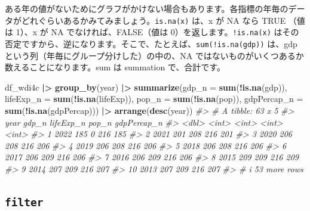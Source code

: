 \documentclass[
  xelatex, ja=standard]{bxjsbook}
\newenvironment{Shaded}{\begin{snugshade}}{\end{snugshade}}
\newcommand{\AttributeTok}[1]{\textcolor[rgb]{0.13,0.29,0.53}{#1}}
\newcommand{\CommentTok}[1]{\textcolor[rgb]{0.56,0.35,0.01}{\textit{#1}}}
\newcommand{\FunctionTok}[1]{\textcolor[rgb]{0.13,0.29,0.53}{\textbf{#1}}}
\newcommand{\NormalTok}[1]{#1}
\newcommand{\SpecialCharTok}[1]{\textcolor[rgb]{0.81,0.36,0.00}{\textbf{#1}}}
\theoremstyle{definition}
\theoremstyle{definition}
\theoremstyle{definition}
\theoremstyle{definition}
\theoremstyle{remark}
\begin{document}
ある年の値がないためにグラフがかけない場合もあります。各指標の年毎のデータがどれぐらいあるかみてみましょう。\texttt{is.na(x)} は、x が NA なら TRUE （値は 1）、x が NA でなければ、FALSE（値は 0）を返します。\texttt{!is.na(x)} はその否定ですから、逆になります。そこで、たとえば、\texttt{sum(!is.na(gdp))} は、gdp という列（年毎にグループ分けした）の中の、NA ではないものがいくつあるか数えることになります。sum は summation で、合計です。

\begin{Shaded}
\begin{Highlighting}[]
\NormalTok{df\_wdi4c }\SpecialCharTok{|\textgreater{}} \FunctionTok{group\_by}\NormalTok{(year) }\SpecialCharTok{|\textgreater{}} 
  \FunctionTok{summarize}\NormalTok{(}\AttributeTok{gdp\_n =} \FunctionTok{sum}\NormalTok{(}\SpecialCharTok{!}\FunctionTok{is.na}\NormalTok{(gdp)), }\AttributeTok{lifeExp\_n =} \FunctionTok{sum}\NormalTok{(}\SpecialCharTok{!}\FunctionTok{is.na}\NormalTok{(lifeExp)), }\AttributeTok{pop\_n =} \FunctionTok{sum}\NormalTok{(}\SpecialCharTok{!}\FunctionTok{is.na}\NormalTok{(pop)), }\AttributeTok{gdpPercap\_n =} \FunctionTok{sum}\NormalTok{(}\SpecialCharTok{!}\FunctionTok{is.na}\NormalTok{(gdpPercap))) }\SpecialCharTok{|\textgreater{}} \FunctionTok{arrange}\NormalTok{(}\FunctionTok{desc}\NormalTok{(year))}
\CommentTok{\#\textgreater{} \# A tibble: 63 x 5}
\CommentTok{\#\textgreater{}     year gdp\_n lifeExp\_n pop\_n gdpPercap\_n}
\CommentTok{\#\textgreater{}    \textless{}dbl\textgreater{} \textless{}int\textgreater{}     \textless{}int\textgreater{} \textless{}int\textgreater{}       \textless{}int\textgreater{}}
\CommentTok{\#\textgreater{}  1  2022   185         0   216         185}
\CommentTok{\#\textgreater{}  2  2021   201       208   216         201}
\CommentTok{\#\textgreater{}  3  2020   206       208   216         206}
\CommentTok{\#\textgreater{}  4  2019   206       208   216         206}
\CommentTok{\#\textgreater{}  5  2018   206       208   216         206}
\CommentTok{\#\textgreater{}  6  2017   206       209   216         206}
\CommentTok{\#\textgreater{}  7  2016   206       209   216         206}
\CommentTok{\#\textgreater{}  8  2015   209       209   216         209}
\CommentTok{\#\textgreater{}  9  2014   207       209   216         207}
\CommentTok{\#\textgreater{} 10  2013   207       209   216         207}
\CommentTok{\#\textgreater{} \# i 53 more rows}
\end{Highlighting}
\end{Shaded}

\hypertarget{filter}{%
\subsection{\texorpdfstring{\texttt{filter}}{filter}}\label{filter}}
\end{document}
